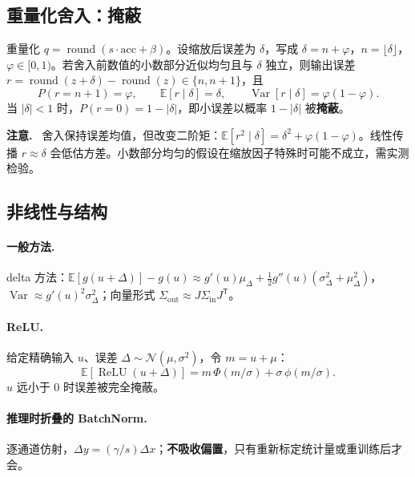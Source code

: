 \documentclass[11pt,a4paper]{ctexart}
\newcommand{\E}{\mathbb{E}}
\DeclareMathOperator{\Var}{Var}
\DeclareMathOperator{\ReLU}{ReLU}
\DeclareMathOperator{\round}{round}
\newenvironment{caution}{\par\medskip\noindent\textbf{注意.}\ }{\par\medskip}
\begin{document}
\subsection{重量化舍入：掩蔽}
重量化 $q = \round(s\cdot\text{acc} + \beta)$。设缩放后误差为 $\delta$，写成 $\delta = n + \varphi$，$n = \lfloor\delta\rfloor$，$\varphi\in[0,1)$。若舍入前数值的小数部分近似均匀且与 $\delta$ 独立，则输出误差 $r = \round(z+\delta) - \round(z) \in \{n, n+1\}$，且
\begin{equation}
P(r = n+1) = \varphi,\qquad \E[r\mid\delta] = \delta,\qquad \Var[r\mid\delta] = \varphi(1-\varphi).
\end{equation}
当 $|\delta| < 1$ 时，$P(r = 0) = 1 - |\delta|$，即小误差以概率 $1-|\delta|$ 被\textbf{掩蔽}。

\begin{caution}
舍入保持误差均值，但改变二阶矩：$\E[r^2\mid\delta] = \delta^2 + \varphi(1-\varphi)$。线性传播 $r\approx\delta$ 会低估方差。小数部分均匀的假设在缩放因子特殊时可能不成立，需实测检验。
\end{caution}

\subsection{非线性与结构}
\paragraph{一般方法.} delta 方法：$\E[g(u+\Delta)] - g(u) \approx g'(u)\mu_\Delta + \tfrac12 g''(u)(\sigma_\Delta^2 + \mu_\Delta^2)$，$\Var \approx g'(u)^2\sigma_\Delta^2$；向量形式 $\Sigma_{\text{out}} \approx J\Sigma_{\text{in}}J^{\mathsf T}$。

\paragraph{ReLU.} 给定精确输入 $u$、误差 $\Delta\sim\mathcal N(\mu,\sigma^2)$，令 $m = u+\mu$：
\begin{equation}
\E[\ReLU(u+\Delta)] = m\,\Phi(m/\sigma) + \sigma\,\phi(m/\sigma).
\end{equation}
$u$ 远小于 0 时误差被完全掩蔽。

\paragraph{推理时折叠的 BatchNorm.} 逐通道仿射，$\Delta y = (\gamma/s)\Delta x$；\textbf{不吸收偏置}，只有重新标定统计量或重训练后才会。
\end{document}
